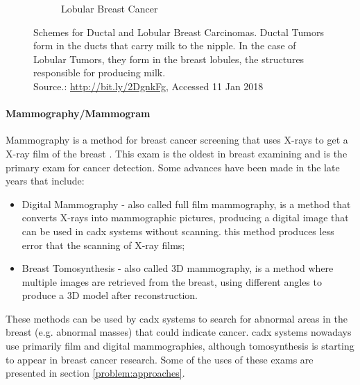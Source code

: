 \documentclass[
  twoside,
  11pt, a4paper,
  footinclude=true,
  headinclude=true,
  cleardoublepage=empty
]{scrbook}
\begin{document}
{\begin{figure}[t]
\begin{subfigure}[t]{0.5\textwidth}
                  \caption{Lobular Breast Cancer}
                  \label{background:medical-image:breast-cancer-diagnosis:lobular}
                \end{subfigure}
                \caption[Schemes for Ductal and Lobular Breast Carcinomas]{Schemes for Ductal and Lobular Breast Carcinomas. Ductal Tumors form in the ducts that carry milk to the nipple. In the case of Lobular Tumors, they form in the breast lobules, the structures responsible for producing milk.\\Source.: \href{http://bit.ly/2DgnkFg}{http://bit.ly/2DgnkFg}, Accessed 11 Jan 2018}
                \label{background:medical-image:breast-cancer-diagnosis:types}
            \end{figure}
        }

        \paragraph{Mammography/Mammogram}
          Mammography is a method for breast cancer screening that uses X-rays to get a X-ray film of the breast \cite{starting2012mammography}. This exam is the oldest in breast examining and is the primary exam for cancer detection. Some advances have been made in the late years that include:

          \begin{itemize}
            \item Digital Mammography - also called full film mammography, is a method that converts X-rays into mammographic pictures, producing a digital image that can be used in \gls{cadx} systems without scanning. this method produces less error that the scanning of X-ray films;
            \item Breast Tomosynthesis - also called 3D mammography, is a method where multiple images are retrieved from the breast, using different angles to produce a 3D model after reconstruction.
          \end{itemize}

          These methods can be used by \gls{cadx} systems to search for abnormal areas in the breast (e.g. abnormal masses) that could indicate cancer. \gls{cadx} systems nowadays use primarily film and digital mammographies, although tomosynthesis is starting to appear in breast cancer research. Some of the uses of these exams are presented in section \ref{problem:approaches}.
\end{document}
